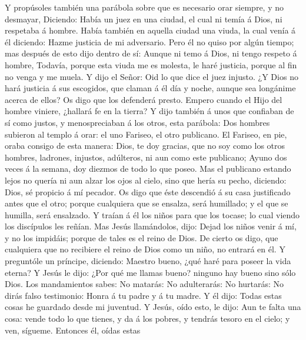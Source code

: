  Y propúsoles también una parábola sobre que es necesario
orar siempre, y no desmayar,  Diciendo: Había un juez en
una ciudad, el cual ni temía á Dios, ni respetaba á hombre.
 Había también en aquella ciudad una viuda, la cual venía
á él diciendo: Hazme justicia de mi adversario.  Pero él
no quiso por algún tiempo; mas después de esto dijo dentro de sí: Aunque
ni temo á Dios, ni tengo respeto á hombre,  Todavía,
porque esta viuda me es molesta, le haré justicia, porque al fin no
venga y me muela.  Y dijo el Señor: Oid lo que dice el
juez injusto.  ¿Y Dios no hará justicia á sus escogidos,
que claman á él día y noche, aunque sea longánime acerca de ellos?
 Os digo que los defenderá presto. Empero cuando el Hijo
del hombre viniere, ¿hallará fe en la tierra?  Y dijo
también á unos que confiaban de sí como justos, y menospreciaban á los
otros, esta parábola:  Dos hombres subieron al templo á
orar: el uno Fariseo, el otro publicano.  El Fariseo, en
pie, oraba consigo de esta manera: Dios, te doy gracias, que no soy como
los otros hombres, ladrones, injustos, adúlteros, ni aun como este
publicano;  Ayuno dos veces á la semana, doy diezmos de
todo lo que poseo.  Mas el publicano estando lejos no
quería ni aun alzar los ojos al cielo, sino que hería su pecho,
diciendo: Dios, sé propicio á mí pecador.  Os digo que
éste descendió á su casa justificado antes que el otro; porque
cualquiera que se ensalza, será humillado; y el que se humilla, será
ensalzado.  Y traían á él los niños para que los tocase;
lo cual viendo los discípulos les reñían.  Mas Jesús
llamándolos, dijo: Dejad los niños venir á mí, y no los impidáis; porque
de tales es el reino de Dios.  De cierto os digo, que
cualquiera que no recibiere el reino de Dios como un niño, no entrará en
él.  Y preguntóle un príncipe, diciendo: Maestro bueno,
¿qué haré para poseer la vida eterna?  Y Jesús le dijo:
¿Por qué me llamas bueno? ninguno hay bueno sino sólo Dios.
 Los mandamientos sabes: No matarás: No adulterarás: No
hurtarás: No dirás falso testimonio: Honra á tu padre y á tu madre.
 Y él dijo: Todas estas cosas he guardado desde mi
juventud.  Y Jesús, oído esto, le dijo: Aun te falta una
cosa: vende todo lo que tienes, y da á los pobres, y tendrás tesoro en
el cielo; y ven, sígueme.  Entonces él, oídas estas

